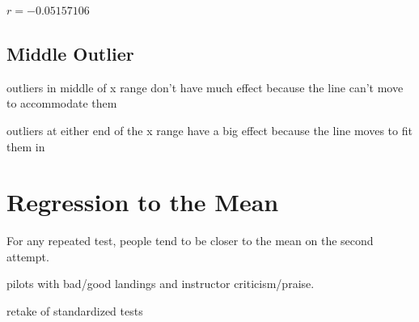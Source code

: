 \documentclass[landscape]{exam}
\begin{document}
  $r = -0.05157106$

  \subsection{Middle Outlier}
  \begin{itemize*}
    \item outliers in middle of x range don't have much effect because the line can't
      move to accommodate them

    \item outliers at either end of the x range have a big effect because the line
      moves to fit them in
  \end{itemize*}

  \section{Regression to the Mean}
  For any repeated test, people tend to be closer to the mean on the second attempt.

  \begin{itemize*}
    \item pilots with bad/good landings and instructor criticism/praise.
    \item retake of standardized tests
  \end{itemize*}
\end{document}
